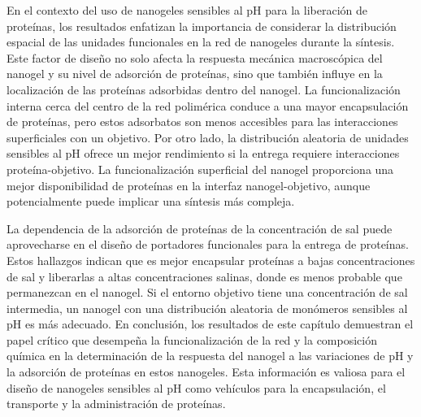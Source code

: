 En el contexto del uso de nanogeles sensibles al pH para la liberaci\'on de prote\'inas, los resultados enfatizan la importancia de considerar la distribuci\'on espacial de las unidades funcionales en la red de nanogeles durante la s\'intesis.
Este factor de dise\~no no solo afecta la respuesta mec\'anica macrosc\'opica del nanogel y su nivel de adsorci\'on de prote\'inas, sino que tambi\'en influye en la localizaci\'on de las prote\'inas adsorbidas dentro del nanogel.
La funcionalizaci\'on interna cerca del centro de la red polim\'erica conduce a una mayor encapsulaci\'on de prote\'inas, pero estos adsorbatos son menos accesibles para las interacciones superficiales con un objetivo.
Por otro lado, la distribuci\'on aleatoria de unidades sensibles al pH ofrece un mejor rendimiento si la entrega requiere interacciones prote\'ina-objetivo.
La funcionalizaci\'on superficial del nanogel proporciona una mejor disponibilidad de prote\'inas en la interfaz nanogel-objetivo, aunque potencialmente puede implicar una s\'intesis m\'as compleja.

La dependencia de la adsorci\'on de prote\'inas de la concentraci\'on de sal puede aprovecharse en el dise\~no de portadores funcionales para la entrega de prote\'inas.
Estos hallazgos indican que es mejor encapsular prote\'inas a bajas concentraciones de sal y liberarlas a altas concentraciones salinas, donde es menos probable que permanezcan en el nanogel.
Si el entorno objetivo tiene una concentraci\'on de sal intermedia, un nanogel con una distribuci\'on aleatoria de mon\'omeros sensibles al pH es m\'as adecuado.
En conclusi\'on, los resultados de este cap\'itulo demuestran el papel cr\'itico que desempe\~na la funcionalizaci\'on de la red y la composici\'on qu\'imica en la determinaci\'on de la respuesta del nanogel a las variaciones de pH y la adsorci\'on de prote\'inas en estos nanogeles.
Esta informaci\'on es valiosa para el dise\~no de nanogeles sensibles al pH como veh\'iculos para la encapsulaci\'on, el transporte y la administraci\'on de prote\'inas.

